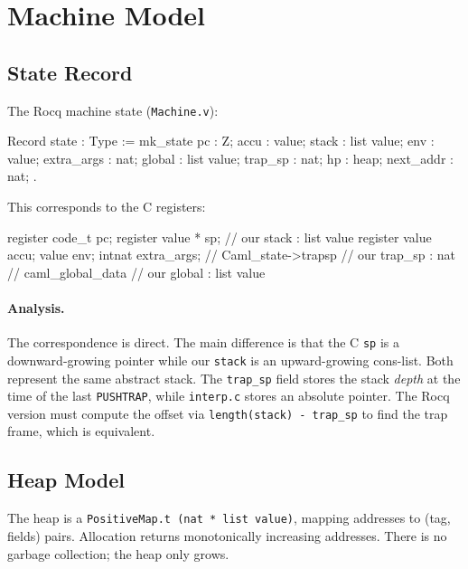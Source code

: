 \documentclass[11pt,a4paper]{article}
\newif\ifinternalaudit
\begin{document}
\section{Machine Model}
\label{sec:machine}

\subsection{State Record}

The Rocq machine state (\texttt{Machine.v}):

\begin{rocqcode}
Record state : Type := mk_state {
  pc         : Z;
  accu       : value;
  stack      : list value;
  env        : value;
  extra_args : nat;
  global     : list value;
  trap_sp    : nat;
  hp         : heap;
  next_addr  : nat;
}.
\end{rocqcode}

This corresponds to the C registers:
\begin{ccode}
register code_t pc;
register value * sp;      // our stack : list value
register value accu;
value env;
intnat extra_args;
// Caml_state->trapsp      // our trap_sp : nat
// caml_global_data         // our global : list value
\end{ccode}

\ifinternalaudit
\paragraph{Analysis.}
The correspondence is direct.  The main difference is that the C \texttt{sp}
is a downward-growing pointer while our \texttt{stack} is an
upward-growing cons-list.  Both represent the same abstract stack.
The \texttt{trap\_sp} field stores the stack \emph{depth} at the time of the
last \texttt{PUSHTRAP}, while \texttt{interp.c} stores an absolute pointer.
The Rocq version must compute the offset via
\texttt{length(stack) - trap\_sp} to find the trap frame, which is equivalent.

\subsection{Heap Model}

The heap is a \texttt{PositiveMap.t (nat * list value)}, mapping addresses to
(tag, fields) pairs.  Allocation returns monotonically increasing addresses.
There is no garbage collection; the heap only grows.
\end{document}
